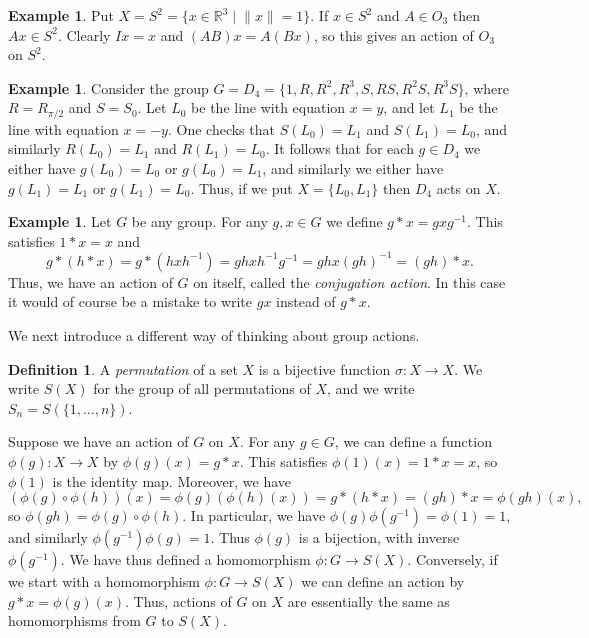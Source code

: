 \documentclass{amsart}
\newcommand{\R}         {{\mathbb{R}}}
\newcommand{\st}        {\;|\;}
\newcommand{\xra}       {\xrightarrow}
\newcommand{\sg}        {\sigma}
\renewcommand{\:}{\colon}
\theoremstyle{definition}
\newtheorem{definition}[theorem]{Definition}
\newtheorem{example}[theorem]{Example}
\begin{document}
\begin{example}\label{eg-O-three-action}
 Put $X=S^2=\{x\in\R^3\st \|x\|=1\}$.  If $x\in S^2$ and $A\in O_3$
 then $Ax\in S^2$.  Clearly $Ix=x$ and $(AB)x=A(Bx)$, so this gives an
 action of $O_3$ on $S^2$.
\end{example}
\begin{example}\label{eg-D-four-action}
 Consider the group $G=D_4=\{1,R,R^2,R^3,S,RS,R^2S,R^3S\}$, where
 $R=R_{\pi/2}$ and $S=S_0$.  Let $L_0$ be the line with equation
 $x=y$, and let $L_1$ be the line with equation $x=-y$.  One checks
 that $S(L_0)=L_1$ and $S(L_1)=L_0$, and similarly $R(L_0)=L_1$ and
 $R(L_1)=L_0$.  It follows that for each $g\in D_4$ we either have
 $g(L_0)=L_0$ or $g(L_0)=L_1$, and similarly we either have
 $g(L_1)=L_1$ or $g(L_1)=L_0$.  Thus, if we put $X=\{L_0,L_1\}$ then
 $D_4$ acts on $X$.
\end{example}
\begin{example}\label{eg-conj-action}
 Let $G$ be any group.  For any $g,x\in G$ we define $g*x=gxg^{-1}$.
 This satisfies $1*x=x$ and
 \[ g*(h*x)=g*(hxh^{-1})=ghxh^{-1}g^{-1}=ghx(gh)^{-1}=(gh)*x. \]
 Thus, we have an action of $G$ on itself, called the
 \emph{conjugation action}.  In this case it would of course be a
 mistake to write $gx$ instead of $g*x$.
\end{example}

We next introduce a different way of thinking about group actions.
\begin{definition}\label{defn-SX}
 A \emph{permutation} of a set $X$ is a bijective function
 $\sg\:X\xra{}X$.  We write $S(X)$ for the group of all permutations
 of $X$, and we write $S_n=S(\{1,\ldots,n\})$.
\end{definition}

Suppose we have an action of $G$ on $X$.  For any $g\in G$, we can
define a function $\phi(g)\:X\xra{}X$ by $\phi(g)(x)=g*x$.  This
satisfies $\phi(1)(x)=1*x=x$, so $\phi(1)$ is the identity map.
Moreover, we have
\[ (\phi(g)\circ\phi(h))(x) = \phi(g)(\phi(h)(x)) =
    g*(h*x)= (gh)*x = \phi(gh)(x),
\]
so $\phi(gh)=\phi(g)\circ\phi(h)$.  In particular, we have
$\phi(g)\phi(g^{-1})=\phi(1)=1$, and similarly
$\phi(g^{-1})\phi(g)=1$.  Thus $\phi(g)$ is a bijection, with inverse
$\phi(g^{-1})$.  We have thus defined a homomorphism
$\phi\:G\xra{}S(X)$.  Conversely, if we start with a homomorphism
$\phi\:G\xra{}S(X)$ we can define an action by $g*x=\phi(g)(x)$.
Thus, actions of $G$ on $X$ are essentially the same as homomorphisms
from $G$ to $S(X)$.
\end{document}
